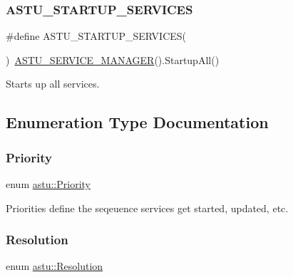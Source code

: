 \subsubsection{\texorpdfstring{A\+S\+T\+U\+\_\+\+S\+T\+A\+R\+T\+U\+P\+\_\+\+S\+E\+R\+V\+I\+C\+ES}{ASTU\_STARTUP\_SERVICES}}
{\footnotesize\ttfamily \#define A\+S\+T\+U\+\_\+\+S\+T\+A\+R\+T\+U\+P\+\_\+\+S\+E\+R\+V\+I\+C\+ES(\begin{DoxyParamCaption}{ }\end{DoxyParamCaption})~\hyperlink{group__srv__group_ga5216c57cf872d6a0c05d0e6f33c66fc7}{A\+S\+T\+U\+\_\+\+S\+E\+R\+V\+I\+C\+E\+\_\+\+M\+A\+N\+A\+G\+ER}().Startup\+All()}

Starts up all services. 

\subsection{Enumeration Type Documentation}
\mbox{\label{group__srv__group_gaf164c3f1c393e1f240458ae4fcd484a0}} 
\subsubsection{\texorpdfstring{Priority}{Priority}}
{\footnotesize\ttfamily enum \hyperlink{group__srv__group_gaf164c3f1c393e1f240458ae4fcd484a0}{astu\+::\+Priority}}

Priorities define the seqeuence services get started, updated, etc. \mbox{\label{group__srv__group_ga68a91c7015964dbdea802829ae5ccb3c}} 
\subsubsection{\texorpdfstring{Resolution}{Resolution}}
{\footnotesize\ttfamily enum \hyperlink{group__srv__group_ga68a91c7015964dbdea802829ae5ccb3c}{astu\+::\+Resolution}\hspace{0.3cm}{\ttfamily [strong]}}

